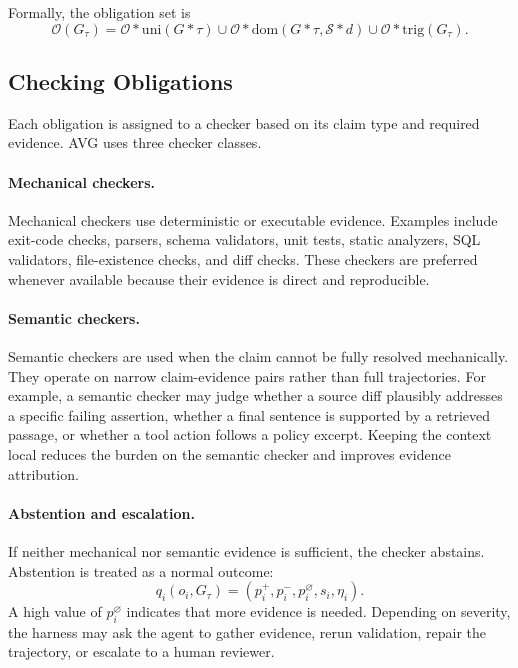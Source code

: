 \documentclass{article} %
\newcommand{\AVG}{\textsc{AVG}\xspace}
\begin{document}
Formally, the obligation set is
\begin{equation}
\mathcal{O}(G_\tau)
=
\mathcal{O}*{\mathrm{uni}}(G*\tau)
\cup
\mathcal{O}*{\mathrm{dom}}(G*\tau,\mathcal{S}*d)
\cup
\mathcal{O}*{\mathrm{trig}}(G_\tau).
\end{equation}

\subsection{Checking Obligations}

Each obligation is assigned to a checker based on its claim type and required evidence. \AVG uses three checker classes.

\paragraph{Mechanical checkers.}
Mechanical checkers use deterministic or executable evidence. Examples include exit-code checks, parsers, schema validators, unit tests, static analyzers, SQL validators, file-existence checks, and diff checks. These checkers are preferred whenever available because their evidence is direct and reproducible.

\paragraph{Semantic checkers.}
Semantic checkers are used when the claim cannot be fully resolved mechanically. They operate on narrow claim-evidence pairs rather than full trajectories. For example, a semantic checker may judge whether a source diff plausibly addresses a specific failing assertion, whether a final sentence is supported by a retrieved passage, or whether a tool action follows a policy excerpt. Keeping the context local reduces the burden on the semantic checker and improves evidence attribution.

\paragraph{Abstention and escalation.}
If neither mechanical nor semantic evidence is sufficient, the checker abstains. Abstention is treated as a normal outcome:
\begin{equation}
q_i(o_i,G_\tau)
=
(p_i^{+},p_i^{-},p_i^{\varnothing},s_i,\eta_i).
\end{equation}
A high value of $p_i^{\varnothing}$ indicates that more evidence is needed. Depending on severity, the harness may ask the agent to gather evidence, rerun validation, repair the trajectory, or escalate to a human reviewer.
\end{document}
